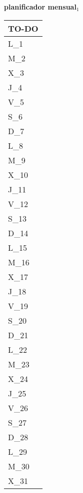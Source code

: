 \clearpage
\raggedright{
	\fontsize{25}{50}\selectfont
	\textbf{\NextYear}
}\scriptsize{\textbf{planificador mensual$_1$}}\\[11.3pt]



	\noindent\dotfill
	\renewcommand{\arraystretch}{1.5}\scriptsize
		\begin{longtabu} to \textwidth { X[l]}
		\centering \small{\textbf{TO-DO}} \\
		\toprule
		L_{1} \dotfill\\
		M_{2} \dotfill\\
		X_{3} \dotfill\\
		J_{4} \dotfill\\
		V_{5} \dotfill\\
		S_{6} \dotfill\\
		D_{7} \dotfill\\
		\hline
		L_{8} \dotfill\\
		M_{9} \dotfill\\
		X_{10} \dotfill\\
		J_{11} \dotfill\\
		V_{12} \dotfill\\
		S_{13} \dotfill\\
		D_{14} \dotfill\\
		\hline
		L_{15} \dotfill\\
		M_{16} \dotfill\\
		X_{17} \dotfill\\
		J_{18} \dotfill\\
		V_{19} \dotfill\\
		S_{20} \dotfill\\
		D_{21} \dotfill\\
		\hline
		L_{22} \dotfill\\
		M_{23} \dotfill\\
		X_{24} \dotfill\\
		J_{25} \dotfill\\
		V_{26} \dotfill\\
		S_{27} \dotfill\\
		D_{28} \dotfill\\
		\hline
		L_{29} \dotfill\\
		M_{30} \dotfill\\
		X_{31} \dotfill\\

		\bottomrule

	\end{longtabu}


\clearpage
